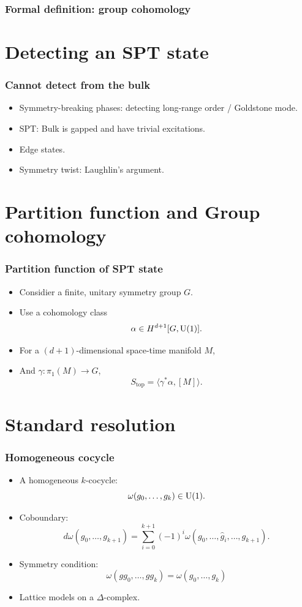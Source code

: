 \documentclass[xcolor=table, 12pt, aspectratio=43,ignorenonframetext]{beamer}
\newcommand{\uone}{\text U(1)}
\begin{document}
\begin{frame}
\frametitle{Formal definition: group cohomology}
\end{frame}

\section{Detecting an SPT state}

\begin{frame}
	\frametitle{Cannot detect from the bulk}
	\begin{itemize}
		\item Symmetry-breaking phases: detecting long-range order / Goldstone mode.
		\item SPT: Bulk is gapped and have trivial excitations.
		\item Edge states.
		\item Symmetry twist: Laughlin's argument.
	\end{itemize}
	\begin{center}
	\end{center}
\end{frame}

\section{Partition function and Group cohomology}

\begin{frame}
	\frametitle{Partition function of SPT state}
	\begin{itemize}
		\item Considier a finite, unitary symmetry group $G$.
		\item Use a cohomology class
		\[\alpha \in H^{d+1}[G, \uone].\]
		\item For a $(d+1)$-dimensional space-time manifold $M$,
		\item And $\gamma:\pi_1(M)\rightarrow G$,
		\[S_{\text{top}} = \langle \gamma^\ast\alpha,[M]\rangle.\]
	\end{itemize}
\end{frame}

\section{Standard resolution}

\begin{frame}
	\frametitle{Homogeneous cocycle}
	\begin{itemize}
		\item A homogeneous $k$-cocycle:
		\[\omega(g_0,\ldots,g_k)\in \uone.\]
		\item Coboundary:
		\[d\omega(g_0,\ldots,g_{k+1}) = \sum_{i=0}^{k+1}(-1)^i
		\omega(g_0,\ldots,\hat g_i,\ldots,g_{k+1}).\]
		\item Symmetry condition:
		\[\omega(gg_0,\ldots,gg_k)=\omega(g_0,\ldots,g_k)\]
		\item Lattice models on a $\Delta$-complex.
	\end{itemize}
\end{frame}
\end{document}
